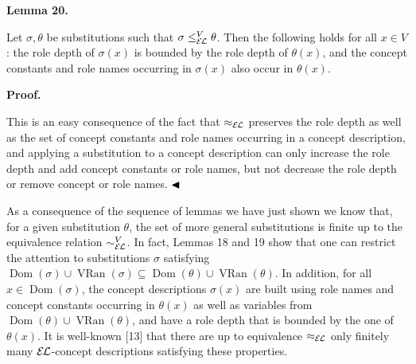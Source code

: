   
 
 
\par\medskip\noindent\textbf{Lemma 20.}\par
 
 
Let $\sigma,\theta$ be substitutions such that $\sigma\leq_{\mathcal{E\mkern-1.618muL}}^{V}\theta$. Then the following holds for all $x\in V$: the role depth of $\sigma(x)$ is bounded by the role depth of $\theta(x)$, and the concept constants and role names occurring in $\sigma(x)$ also occur in $\theta(x)$.\par
 
 
 
 
 
\par\medskip\noindent\textbf{Proof.}\par
 
 
This is an easy consequence of the fact that $\approx_{\mathcal{E\mkern-1.618muL}}$ preserves the role depth as well as the set of concept constants and role names occurring in a concept description, and applying a substitution to a concept description can only increase the role depth and add concept constants or role names, but not decrease the role depth or remove concept or role names. $\hfill\blacktriangleleft$\par
 
 
 
As a consequence of the sequence of lemmas we have just shown we know that, for a given substitution $\theta$, the set of more general substitutions is finite up to the equivalence relation $\sim_{\mathcal{E\mkern-1.618muL}}^{V}$. In fact, Lemmas 18 and 19 show that one can restrict the attention to substitutions $\sigma$ satisfying $\operatorname{Dom}(\sigma)\cup\operatorname{VRan}(\sigma)\subseteq%
\operatorname{Dom}(\theta)\cup\operatorname{VRan}(\theta)$. In addition, for all $x\in\operatorname{Dom}(\sigma)$, the concept descriptions $\sigma(x)$ are built using role names and concept constants occurring in $\theta(x)$ as well as variables from $\operatorname{Dom}(\theta)\cup\operatorname{VRan}(\theta)$, and have a role depth that is bounded by the one of $\theta(x)$. It is well-known [13] that there are up to equivalence $\approx_{\mathcal{E\mkern-1.618muL}}$ only finitely many $\mathcal{E\mkern-1.618muL}$-concept descriptions satisfying these properties.\par
 
